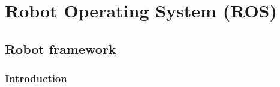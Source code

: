 \chapter{Robot Operating System (ROS)}\label{chap:ROS}
\section{Robot framework} 
\subsection{Introduction}